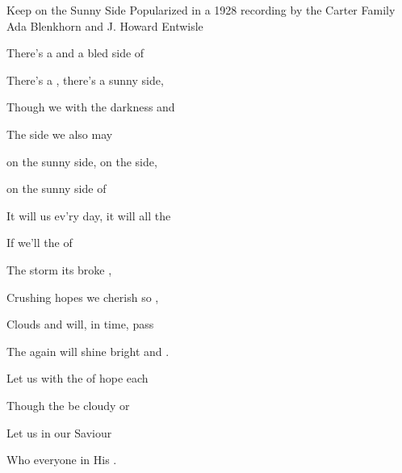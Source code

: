 \begin{SBSong}{Keep on the Sunny Side}
  {Popularized in a 1928 recording by the Carter Family}
  {Ada Blenkhorn and J. Howard Entwisle}
  \begin{SBVerse}
    There's a  and a bled side of 

    There's a , there's a sunny side, 

    Though we  with the darkness and 

    The  side we also may 
  \end{SBVerse}
  \WBPageBrk
  \begin{SBChorus}
     on the sunny side,  on the  side,

     on the sunny side of 
    
    It will  us ev'ry day, it will  all the 
    
    If we'll   the   of 
  \end{SBChorus}
  \begin{SBVerse}
    The storm  its  broke ,
    
    Crushing hopes  we cherish so ,
    
    Clouds and  will, in time, pass 
    
    The  again will shine bright and .
  \end{SBVerse}
  \begin{SBVerse}
    Let us  with the  of hope each 
    
    Though the  be cloudy or 
    
    Let us  in our Saviour 
    
    Who  everyone in His .
  \end{SBVerse}
\end{SBSong}

